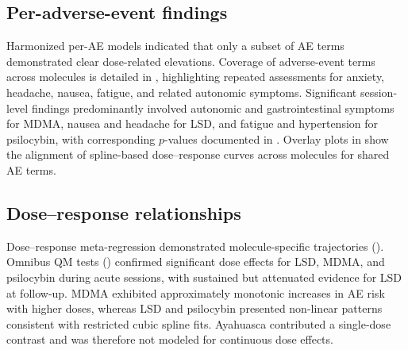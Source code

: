 \subsection{Per-adverse-event findings}
Harmonized per-AE models indicated that only a subset of AE terms demonstrated clear dose-related elevations. Coverage of adverse-event terms across molecules is detailed in , highlighting repeated assessments for anxiety, headache, nausea, fatigue, and related autonomic symptoms. Significant session-level findings predominantly involved autonomic and gastrointestinal symptoms for MDMA, nausea and headache for LSD, and fatigue and hypertension for psilocybin, with corresponding $p$-values documented in . Overlay plots in  show the alignment of spline-based dose--response curves across molecules for shared AE terms.




\subsection{Dose--response relationships}
Dose--response meta-regression demonstrated molecule-specific trajectories (). Omnibus QM tests () confirmed significant dose effects for LSD, MDMA, and psilocybin during acute sessions, with sustained but attenuated evidence for LSD at follow-up. MDMA exhibited approximately monotonic increases in AE risk with higher doses, whereas LSD and psilocybin presented non-linear patterns consistent with restricted cubic spline fits. Ayahuasca contributed a single-dose contrast and was therefore not modeled for continuous dose effects.

